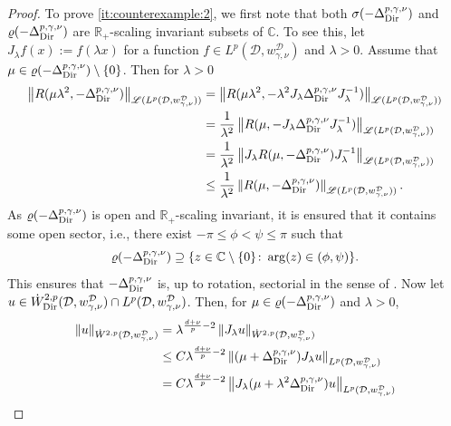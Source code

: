 \documentclass[12pt,a4paper, reqno]{amsart}
\theoremstyle{plain}
\theoremstyle{definition}
\theoremstyle{remark}
\numberwithin{equation}{section}
\newcommand{\1}{\mathbbm{1}}
\newcommand{\R}{\ensuremath{\mathbb{R}}}
\newcommand{\C}{\ensuremath{\mathbb{C}}}
\newcommand{\calD}{\ensuremath{\mathcal{D}}}
\newcommand{\sL}{\ensuremath{\mathscr{L}}}
\newcommand{\Dir}{\textup{Dir}}
\newcommand{\nrm}[1]{\left\lVert #1 \right\rVert}
\begin{document}
\begin{proof}
To prove \ref{it:counterexample:2}, we first note that both $\sigma(-\Delta_\Dir^{p,\gamma,\nu})$ and $\varrho(-\Delta_\Dir^{p,\gamma,\nu})$ are $\R_+$-scaling invariant subsets of $\C$. To see this, let $J_\lambda f(x):= f(\lambda x)$ for a function $f \in L^p(\calD,w_{\gamma,\nu}^\calD)$ and $\lambda>0$. Assume that $\mu \in\varrho(-\Delta_\Dir^{p,\gamma,\nu})\setminus\{0\}$. Then for $\lambda>0$
    \begin{equation}
        \begin{aligned}
            \nrm{R(\mu\lambda^2,-\Delta_\Dir^{p,\gamma,\nu})}_{\sL(L^p(\calD,w_{\gamma,\nu}^\calD))}&= \nrm{R(\mu\lambda^2, -\lambda^2 J_\lambda \Delta_\Dir^{p,\gamma,\nu}J_\lambda^{-1})}_{\sL(L^p(\calD,w_{\gamma,\nu}^\calD))}\\
            &=\frac{1}{\lambda^2}\nrm{R(\mu, -J_\lambda \Delta_\Dir^{p,\gamma,\nu}J_\lambda^{-1})}_{\sL(L^p(\calD,w_{\gamma,\nu}^\calD))}\\
            &=\frac{1}{\lambda^2}\nrm{J_\lambda R(\mu,-\Delta_\Dir^{p,\gamma,\nu})J_\lambda^{-1}}_{\sL(L^p(\calD,w_{\gamma,\nu}^\calD))}\\
            &\le  \frac{1}{\lambda^2}\nrm{R(\mu,-\Delta_\Dir^{p,\gamma,\nu})}_{\sL(L^p(\calD,w_{\gamma,\nu}^\calD))}.
        \end{aligned}
    \end{equation}
As $\varrho(-\Delta_\Dir^{p,\gamma,\nu})$ is open and $\R_+$-scaling invariant, it is ensured that it contains some open sector, i.e., there exist $-\pi\le \phi<\psi\le \pi$ such that 
$$\varrho(-\Delta_\Dir^{p,\gamma,\nu})\supseteq\{z\in\C\setminus \{0\}\colon \arg(z)\in(\phi,\psi)\}. $$
    This ensures that $-\Delta_\Dir^{p,\gamma,\nu}$ is, up to rotation, sectorial in the sense of \cite[Definition~10.1.1]{aibs2}.
    Now let $u\in \Dot W^{2,p}_\Dir(\calD,w_{\gamma,\nu}^\calD)\cap L^p(\calD,w_{\gamma,\nu}^\calD)$. Then, for  $\mu\in \varrho(-\Delta_\Dir^{p,\gamma,\nu})$ and $\lambda>0$,
    \begin{equation}\label{eq:counterexample:1}
        \begin{aligned}
            \nrm{u}_{\Dot W^{2,p}(\calD,w_{\gamma,\nu}^\calD)}&=\lambda^{\frac{d+\nu}{p}-2}\nrm{J_\lambda u}_{\Dot W^{2,p}(\calD,w_{\gamma,\nu}^\calD)}\\
        &\le C \lambda^{\frac{d+\nu}{p}-2}\nrm{(\mu+\Delta_\Dir^{p,\gamma,\nu})J_\lambda u}_{L^p(\calD,w_{\gamma,\nu}^\calD)}\\
        &=C\lambda^{\frac{d+\nu}{p}-2}\nrm{J_\lambda(\mu+\lambda^2\Delta_{\Dir}^{p,\gamma,\nu})u}_{L^p(\calD,w_{\gamma,\nu}^\calD)}\\

\end{aligned}
\end{equation}
\end{proof}
\end{document}
